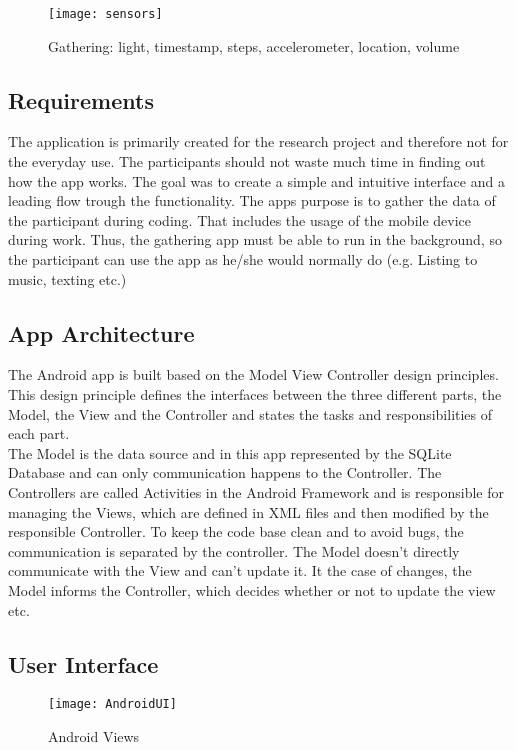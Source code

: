 \begin{figure}
\centering
\texttt{[image: sensors]}
\caption{Gathering: light, timestamp, steps, accelerometer, location, volume}\label{sensors}
\vspace{5 mm}
\end{figure}

\subsection{Requirements}
The application is primarily created for the research project and therefore not for the everyday use. The participants should not waste much time in finding out how the app works. The goal was to create a simple and intuitive interface and a leading flow trough the functionality. The apps purpose is to gather the data of the participant during coding. That includes the usage of the mobile device during work. Thus, the gathering app must be able to run in the background, so the participant can use the app as he/she would normally do (e.g. Listing to music, texting etc.)

\subsection{App Architecture}
The Android app is built based on the Model View Controller design principles. This design principle defines the interfaces between the three different parts, the Model, the View and the Controller and states the tasks and responsibilities of each part.\\
The Model is the data source and in this app represented by the SQLite Database and can only communication happens to the Controller. 
The Controllers are called Activities in the Android Framework and is responsible for managing the Views, which are defined in XML files and then modified by the responsible Controller. 
To keep the code base clean and to avoid bugs, the communication is separated by the controller. The Model doesn't directly communicate with the View and can't update it. It the case of changes, the Model informs the Controller, which decides whether or not to update the view etc. 

\subsection{User Interface}

\begin{figure}
\texttt{[image: AndroidUI]}
\caption{Android Views}\label{aviews}
\vspace{10 mm}
\end{figure}


